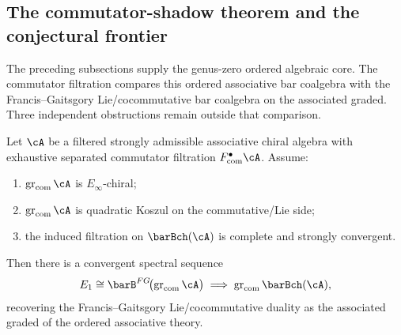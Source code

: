 \subsection{The commutator-shadow theorem and the conjectural frontier}

The preceding subsections supply the genus-zero ordered algebraic
core.  The commutator filtration compares this ordered associative
bar coalgebra with the Francis--Gaitsgory Lie/cocommutative bar
coalgebra on the associated graded.  Three independent obstructions
remain outside that comparison.

\begin{theorem}
\label{thm:ordered-FG-shadow}
Let $\cA$ be a filtered strongly admissible associative chiral algebra
with exhaustive separated commutator filtration
$F_{\mathrm{com}}^\bullet \cA$. Assume:
\begin{enumerate}[label=\textup{(\alph*)}]
\item $\operatorname{gr}_{\mathrm{com}} \cA$ is $E_\infty$-chiral;
\item $\operatorname{gr}_{\mathrm{com}} \cA$ is quadratic Koszul on the
 commutative/Lie side;
\item the induced filtration on $\barBch(\cA)$ is complete and
 strongly convergent.
\end{enumerate}
Then there is a convergent spectral sequence
\[
 E_1 \cong \barB^{FG}\!\bigl(\operatorname{gr}_{\mathrm{com}} \cA\bigr)
 \;\Longrightarrow\;
 \operatorname{gr}_{\mathrm{com}} \barBch(\cA),
\]
recovering the Francis--Gaitsgory Lie/cocommutative duality as the
associated graded of the ordered associative theory.
\end{theorem}

